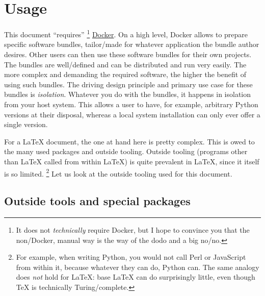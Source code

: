 \chapter{Usage}

This document \enquote{requires}%
\footnote{
  It does not \emph{technically} require Docker, but I hope to convince you that
  the non\-/Docker, manual way is the way of the dodo and a big no\-/no.
}
\href{https://www.docker.com/}{Docker}.
On a high level, Docker allows to prepare specific software bundles, tailor\-/made for
whatever application the bundle author desires.
Other users can then use these software bundles for their own projects.
The bundles are well\-/defined and can be distributed and run very easily.
The more complex and demanding the required software, the higher the benefit of using such bundles.
The driving design principle and primary use case for these bundles is \emph{isolation}.
Whatever you do with the bundles, it happens in isolation from your host system.
This allows a user to have, for example, arbitrary Python versions at their disposal,
whereas a local system installation can only ever offer a single version.

For a \LaTeX{} document, the one at hand here is pretty complex.
This is owed to the many used packages and outside tooling.
Outside tooling (programs other than \LaTeX{} called from within \LaTeX{}) is quite
prevalent in \LaTeX{}, since it itself is so limited.%
\footnote{
  For example, when writing Python, you would not call Perl or JavaScript from within it,
  because whatever they can do, Python can.
  The same analogy does \emph{not} hold for \LaTeX{}: base \LaTeX{} can do surprisingly
  little, even though \TeX{} is technically Turing\-/complete.
}
Let us look at the outside tooling used for this document.

\section{Outside tools and special packages}

